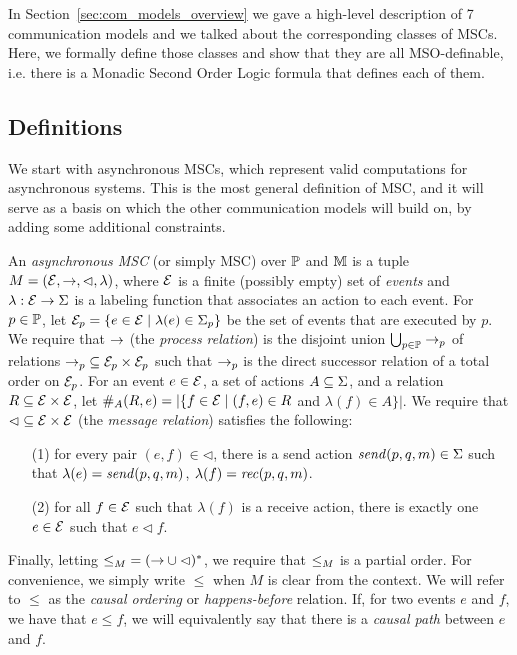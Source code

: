 

In Section~\ref{sec:com_models_overview} we gave a high-level description of 7 communication models and we talked about the corresponding classes of MSCs. Here, we formally define those classes and  show that they are all MSO-definable, i.e. there is a Monadic Second Order Logic formula that defines each of them. 

\subsection{Definitions}

We start with asynchronous MSCs, which represent valid computations for asynchronous systems. This is the most general definition of MSC, and it will serve as a basis on which the other communication models will build on, by adding some additional constraints.

\begin{definition}
An \emph{asynchronous MSC} (or simply MSC) over $\Procs$ and $\Msg$ is a tuple $\msc = (\Events,\procrel,\lhd,\lambda)$, where $\Events$ is a finite (possibly empty) set of \emph{events} and $\lambda: \Events \to \Act$ is a labeling function that associates an action to each event. For $p \in \Procs$, let $\Events_p = \{e \in \Events \mid \lambda(e) \in \pAct{p}\}$ be the set of events that are executed by $p$. We require that $\procrel$ (the \emph{process relation}) is the disjoint union $\bigcup_{p \in \Procs} \procrel_p$ of relations ${\procrel_p} \subseteq \Events_p \times \Events_p$ such that $\procrel_p$ is the direct successor relation of a total order on $\Events_p$. For an event $e \in \Events$, a set of actions $A \subseteq \Act$, and a relation $\rel \subseteq \Events \times \Events$,
let $\sametype{e}{A}{\rel} = |\{f \in \Events \mid (f,e) \in \rel$ and $\lambda(f) \in A\}|$. We require that ${\lhd} \subseteq \Events \times \Events$ (the \emph{message relation}) satisfies the following:
\begin{itemize}\itemsep=0.5ex
\item[(1)] for every pair $(e,f) \in {\lhd}$, there is a send action $\sact{p}{q}{\msg} \in \Act$ such that $\lambda(e) = \sact{p}{q}{\msg}$, $\lambda(f) = \ract{p}{q}{\msg}$.
\item[(2)] for all $f \in \Events$ such that $\lambda(f)$ is a receive action, there is exactly one $e \in \Events$ such that $e \lhd f$.
\end{itemize}
Finally, letting ${\le}_\msc = ({\procrel} \cup {\lhd})^\ast$,
we require that $\le_\msc$ is a partial order. For convenience, we simply write $\le$ when $M$ is clear from the context. We will refer to $\le$ as the \emph{causal ordering} or \emph{happens-before} relation. If, for two events $e$ and $f$, we have that $e \le f$, we will equivalently say that there is a \emph{causal path} between $e$ and $f$.
\end{definition}

